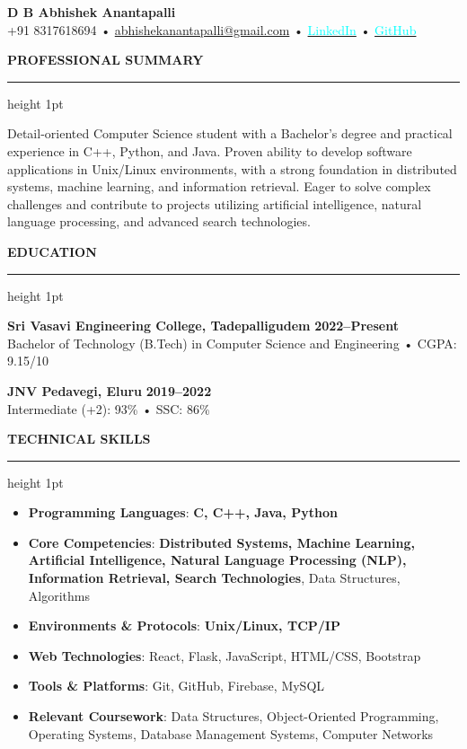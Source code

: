 \documentclass[10pt,a4paper]{article}
\newcommand{\compactspace}{\vspace{6pt}}
\newcommand{\sectiongap}{\vspace{14pt}}
\newcommand{\header}[2]{
    \begin{center}
        {\Huge \textbf{#1}} \\
        \compactspace
        {\medium #2}
    \end{center}
}
\newcommand{\resumesection}[1]{
    \sectiongap
    {\color{primary} \large \textbf{#1}} \\
    \hrule height 1pt \compactspace
}
\begin{document}
\header{D B Abhishek Anantapalli}
{+91 8317618694 \hspace{8pt}• \href{mailto:abhishekanantapalli@gmail.com}{abhishekanantapalli@gmail.com} \hspace{8pt}• 
\href{https://www.linkedin.com/in/abhishekanantapalli/}{\textcolor{cyan}{LinkedIn}} \hspace{8pt}• 
\href{https://github.com/AbhiAnantapalli215}{\textcolor{cyan}{GitHub}}}

\resumesection{PROFESSIONAL SUMMARY}
Detail-oriented Computer Science student with a Bachelor's degree and practical experience in C++, Python, and Java. Proven ability to develop software applications in Unix/Linux environments, with a strong foundation in distributed systems, machine learning, and information retrieval. Eager to solve complex challenges and contribute to projects utilizing artificial intelligence, natural language processing, and advanced search technologies.

\resumesection{EDUCATION}
\textbf{Sri Vasavi Engineering College, Tadepalligudem} \hfill \textbf{2022--Present} \\
\indent Bachelor of Technology (B.Tech) in Computer Science and Engineering • CGPA: 9.15/10

\compactspace
\textbf{JNV Pedavegi, Eluru} \hfill \textbf{2019--2022} \\
\indent Intermediate (+2): 93\% • SSC: 86\%

\resumesection{TECHNICAL SKILLS}
\begin{itemize}
    \item \textbf{Programming Languages}: \textbf{C, C++, Java, Python}
    \item \textbf{Core Competencies}: \textbf{Distributed Systems, Machine Learning, Artificial Intelligence, Natural Language Processing (NLP), Information Retrieval, Search Technologies}, Data Structures, Algorithms
    \item \textbf{Environments \& Protocols}: \textbf{Unix/Linux, TCP/IP}
    \item \textbf{Web Technologies}: React, Flask, JavaScript, HTML/CSS, Bootstrap
    \item \textbf{Tools \& Platforms}: Git, GitHub, Firebase, MySQL
    \item \textbf{Relevant Coursework}: Data Structures, Object-Oriented Programming, Operating Systems, Database Management Systems, Computer Networks
\end{itemize}
\end{document}
